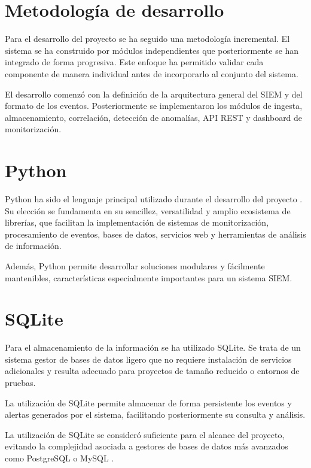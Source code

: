 
\section{Metodología de desarrollo}

Para el desarrollo del proyecto se ha seguido una metodología incremental. El sistema se ha construido por módulos independientes que posteriormente se han integrado de forma progresiva. Este enfoque ha permitido validar cada componente de manera individual antes de incorporarlo al conjunto del sistema.

El desarrollo comenzó con la definición de la arquitectura general del SIEM y del formato de los eventos. Posteriormente se implementaron los módulos de ingesta, almacenamiento, correlación, detección de anomalías, API REST y dashboard de monitorización.

\section{Python}

Python ha sido el lenguaje principal utilizado durante el desarrollo del proyecto \cite{python}. Su elección se fundamenta en su sencillez, versatilidad y amplio ecosistema de librerías, que facilitan la implementación de sistemas de monitorización, procesamiento de eventos, bases de datos, servicios web y herramientas de análisis de información.

Además, Python permite desarrollar soluciones modulares y fácilmente mantenibles, características especialmente importantes para un sistema SIEM.


\section{SQLite}

Para el almacenamiento de la información se ha utilizado SQLite. Se trata de un sistema gestor de bases de datos ligero que no requiere instalación de servicios adicionales y resulta adecuado para proyectos de tamaño reducido o entornos de pruebas.

La utilización de SQLite permite almacenar de forma persistente los eventos y alertas generados por el sistema, facilitando posteriormente su consulta y análisis.

La utilización de SQLite se consideró suficiente para el alcance del proyecto, evitando la complejidad asociada a gestores de bases de datos más avanzados como PostgreSQL \cite{postgresql} o MySQL \cite{mysql}.

